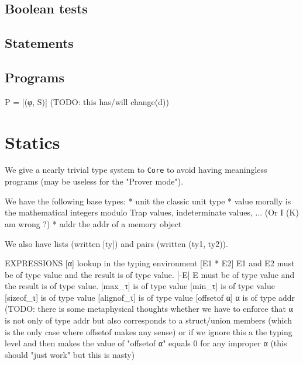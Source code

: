 \documentclass[12pt, a4paper]{article}
\newcommand{\core}{\texttt{Core}}
\begin{document}
\subsection{Boolean tests}

\subsection{Statements}






\subsection{Programs}
{\color{orange} P = [(φ, S)] (TODO: this has/will change(d))}

\section{Statics}
  We give a nearly trivial type system to \core{} to avoid having meaningless
  programs (may be useless for the "Prover mode").
  
  We have the following base types:
    * unit    the classic unit type
    * value   morally is the mathematical integers modulo Trap values,
              indeterminate values, ... (Or I (K) am wrong ?)
    * addr    the addr of a memory object
  
  We also have lists (written [ty]) and pairs (written (ty1, ty2)).
  
  EXPRESSIONS
    [α]           lookup in the typing environment
    [E1 * E2]     E1 and E2 must be of type value and the result is of type
                  value.
    [-E]          E must be of type value and the result is of type value.
    [max\_τ]       is of type value
    [min\_τ]       is of type value
    [sizeof\_τ]    is of type value
    [alignof\_τ]   is of type value
    [offsetof α]  α is of type addr (TODO: there is some metaphysical thoughts
                  whether we have to enforce that α is not only of type addr but
                  also corresponds to a struct/union members (which is the only
                  case where offsetof makes any sense) or if we ignore this a
                  the typing level and then makes the value of "offsetof α"
                  equals 0 for any improper α (this should "just work" but this
                  is nasty)
  
\end{document}
